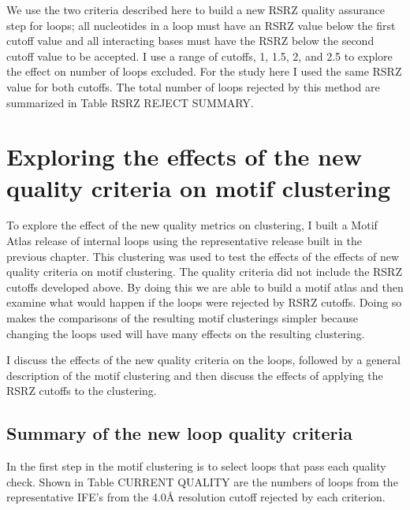 We use the two criteria described here to build a new RSRZ quality assurance
step for loops; all nucleotides in a loop must have an RSRZ value below the
first cutoff value and all interacting bases must have the RSRZ below the second
cutoff value to be accepted. I use a range of cutoffs, 1, 1.5, 2, and 2.5 to
explore the effect on number of loops excluded. For the study here I used the
same RSRZ value for both cutoffs. The total number of loops rejected by this
method are summarized in Table RSRZ REJECT SUMMARY.

\begin{table}
  \begin{tabular}
  \end{tabular}
  \caption{Counts and percent of all loops extracted that are rejected by the
    RSRZ tested here. The percentages are the percent of all loops that are
  rejected by the cutoff.}
\end{table}

\section{Exploring the effects of the new quality criteria on motif clustering}

To explore the effect of the new quality metrics on clustering, I built a Motif
Atlas release of internal loops using the representative release built in the
previous chapter. This clustering was used to test the effects of the effects of
new quality criteria on motif clustering. The quality criteria did not include
the RSRZ cutoffs developed above. By doing this we are able to build a motif
atlas and then examine what would happen if the loops were rejected by RSRZ
cutoffs. Doing so makes the comparisons of the resulting motif clusterings
simpler because changing the loops used will have many effects on the resulting
clustering.

I discuss the effects of the new quality criteria on the loops, followed by a
general description of the motif clustering and then discuss the effects of
applying the RSRZ cutoffs to the clustering. 


\subsection{Summary of the new loop quality criteria}

In the first step in the motif clustering is to select loops that pass each
quality check. Shown in Table CURRENT QUALITY are the numbers of loops from the
representative IFE’s from the 4.0Å resolution cutoff rejected by each criterion.

